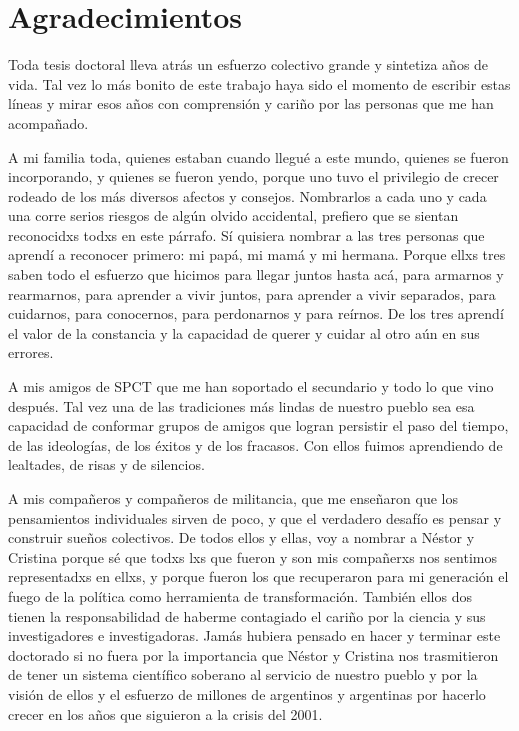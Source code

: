 \chapter*{Agradecimientos}
Toda tesis doctoral lleva atrás un esfuerzo colectivo grande y sintetiza años de vida. Tal vez lo más bonito de este trabajo haya sido el momento de escribir estas líneas y mirar esos años con comprensión y cariño por las personas que me han acompañado.

A mi familia toda, quienes estaban cuando llegué a este mundo, quienes se fueron incorporando, y quienes se fueron yendo, porque uno tuvo el privilegio de crecer rodeado de los más diversos afectos y consejos. Nombrarlos a cada uno y cada una corre serios riesgos de algún olvido accidental, prefiero que se sientan reconocidxs todxs en este párrafo. Sí quisiera nombrar a las tres personas que aprendí a reconocer primero: mi papá, mi mamá y mi hermana. Porque ellxs tres saben todo el esfuerzo que hicimos para llegar juntos hasta acá, para armarnos y rearmarnos, para aprender a vivir juntos, para aprender a vivir separados, para cuidarnos, para conocernos, para perdonarnos y para reírnos. De los tres aprendí el valor de la constancia y la capacidad de querer y cuidar al otro aún en sus errores. 

A mis amigos de SPCT que me han soportado el secundario y todo lo que vino después. Tal vez una de las tradiciones más lindas de nuestro pueblo sea esa capacidad de conformar grupos de amigos que logran persistir el paso del tiempo, de las ideologías, de los éxitos y de los fracasos. Con ellos fuimos aprendiendo de lealtades, de risas y de silencios.

A mis compañeros y compañeros de militancia, que me enseñaron que los pensamientos individuales sirven de poco, y que el verdadero desafío es pensar y construir sueños colectivos. De todos ellos y ellas, voy a nombrar a Néstor y Cristina porque sé que todxs lxs que fueron y son mis compañerxs nos sentimos representadxs en ellxs, y porque fueron los que recuperaron para mi generación el fuego de la política como herramienta de transformación. También ellos dos tienen la responsabilidad de haberme contagiado el cariño por la ciencia y sus investigadores e investigadoras. Jamás hubiera pensado en hacer y terminar este doctorado si no fuera por la importancia que Néstor y Cristina nos trasmitieron de tener un sistema científico soberano al servicio de nuestro pueblo y por la visión de ellos y el esfuerzo de millones de argentinos y argentinas por hacerlo crecer en los años que siguieron a la crisis del 2001.

